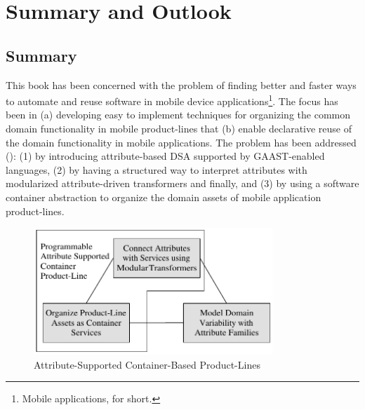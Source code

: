 \chapter{Summary and Outlook}
\label{ch06}

\section{Summary}

This book has been concerned with the problem of finding better and faster ways to automate and reuse software in mobile device applications\footnote{Mobile applications, for short.}. The focus has been in (a) developing easy to implement techniques for organizing the common domain functionality in mobile product-lines that (b) enable declarative reuse of the domain functionality in mobile applications. The problem has been addressed (): (1) by introducing attribute-based DSA supported by GAAST-enabled languages, (2) by having a structured way to interpret attributes with modularized attribute-driven transformers and finally, and (3) by using a software container abstraction to organize the domain assets of mobile application product-lines.

\begin{figure}[ht]
	\begin{center}
		\includegraphics[width=9cm,height=!]{ch06/summary}
	\end{center}
	\caption{Attribute-Supported Container-Based Product-Lines}
	\label{fig:ac-pl}
\end{figure}

